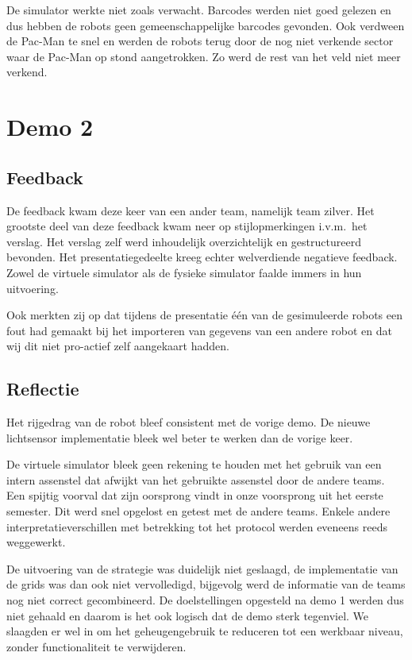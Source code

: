 \documentclass[12pt,a4paper]{report}
\begin{document}
De simulator werkte niet zoals verwacht. Barcodes werden niet goed gelezen en dus hebben de robots geen gemeenschappelijke barcodes gevonden. Ook verdween de Pac-Man te snel en werden de robots terug door de nog niet verkende sector waar de Pac-Man op stond aangetrokken. Zo werd de rest van het veld niet meer verkend.

\section{Demo 2}


\subsection{Feedback}

De feedback kwam deze keer van een ander team, namelijk team zilver. Het grootste deel van deze feedback kwam neer op stijlopmerkingen i.v.m.\ het verslag. Het verslag zelf werd inhoudelijk overzichtelijk en gestructureerd bevonden. Het presentatiegedeelte kreeg echter welverdiende negatieve feedback. Zowel de virtuele simulator als de fysieke simulator faalde immers in hun uitvoering.

Ook merkten zij op dat tijdens de presentatie \'e\'en van de gesimuleerde robots een fout had gemaakt bij het importeren van gegevens van een andere robot en dat wij dit niet pro-actief zelf aangekaart hadden. 

\subsection{Reflectie}

Het rijgedrag van de robot bleef consistent met de vorige demo. De nieuwe lichtsensor implementatie bleek wel beter te werken dan de vorige keer.

De virtuele simulator bleek geen rekening te houden met het gebruik van een intern assenstel dat afwijkt van het gebruikte assenstel door de andere teams. Een spijtig voorval dat zijn oorsprong vindt in onze voorsprong uit het eerste semester. Dit werd snel opgelost en getest met de andere teams. Enkele andere interpretatieverschillen met betrekking tot het protocol werden eveneens reeds weggewerkt.

De uitvoering van de strategie was duidelijk niet geslaagd, de implementatie van de grids was dan ook niet vervolledigd, bijgevolg werd de informatie van de teams nog niet correct gecombineerd.
De doelstellingen opgesteld na demo 1 werden dus niet gehaald en daarom is het ook logisch dat de demo sterk tegenviel. We slaagden er wel in om het geheugengebruik te reduceren tot een werkbaar niveau, zonder functionaliteit te verwijderen.
\end{document}
